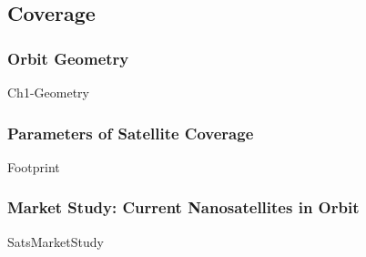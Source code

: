\subsection{Coverage}


\subsubsection{Orbit Geometry}
{Ch1-Geometry}

\subsubsection{Parameters of Satellite Coverage}
{Footprint}

\subsubsection{Market Study: Current Nanosatellites in Orbit}
{SatsMarketStudy}
